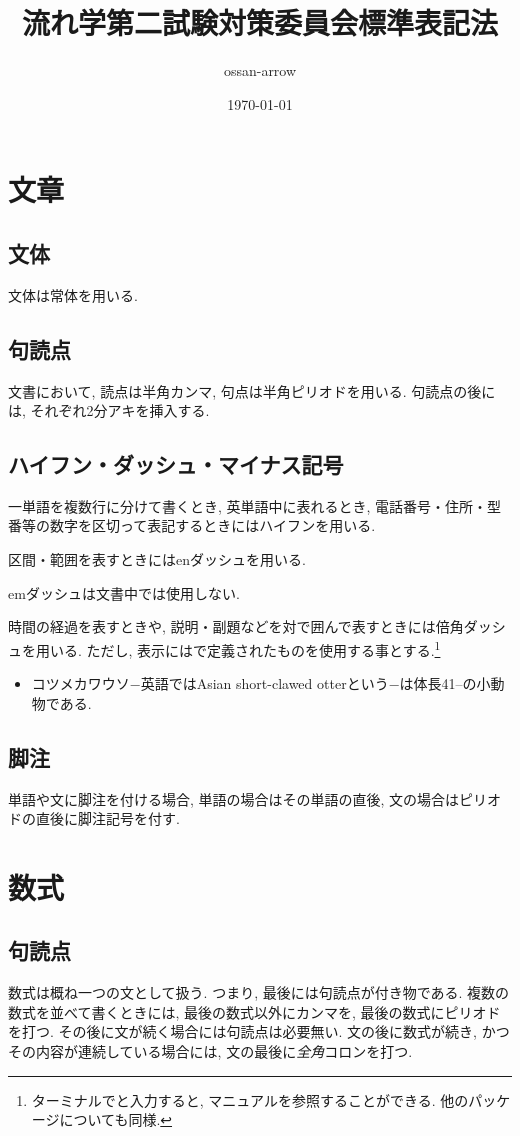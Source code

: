 \documentclass[uplatex,a4j,twocolumn]{jsarticle}
\begin{document}
\title{\「流れ学第二\」試験対策委員会標準表記法}
\author{ossan-arrow}
\date{\today}
\maketitle

\section{文章}
	\subsection{文体}
		文体は常体を用いる.
	\subsection{句読点}
		文書において, 読点は半角カンマ, 句点は半角ピリオドを用いる. 句読点の後には, それぞれ2分アキを挿入する.
	\subsection{ハイフン・ダッシュ・マイナス記号}
		一単語を複数行に分けて書くとき, 英単語中に表れるとき, 電話番号・住所・型番等の数字を区切って表記するときにはハイフンを用いる.
		
		区間・範囲を表すときにはenダッシュを用いる.
		
		emダッシュは文書中では使用しない.
		
		時間の経過を表すときや, 説明・副題などを対で囲んで表すときには倍角ダッシュを用いる. ただし, 表示にはで定義されたものを使用する事とする.\footnote{ターミナルで\『\』と入力すると, マニュアルを参照することができる. 他のパッケージについても同様.}
		\begin{itemize}
			\item コツメカワウソ\−−英語ではAsian short-clawed otterという\−−は体長41--の小動物である.
		\end{itemize}
	\subsection{脚注}
		単語や文に脚注を付ける場合, 単語の場合はその単語の直後, 文の場合はピリオドの直後に脚注記号を付す.
\section{数式}
	\subsection{句読点}
		数式は概ね一つの文として扱う. つまり, 最後には句読点が付き物である. 複数の数式を並べて書くときには, 最後の数式以外にカンマを, 最後の数式にピリオドを打つ. その後に文が続く場合には句読点は必要無い. 文の後に数式が続き, かつその内容が連続している場合には, 文の最後に\emph{全角}コロンを打つ.
\end{document}
